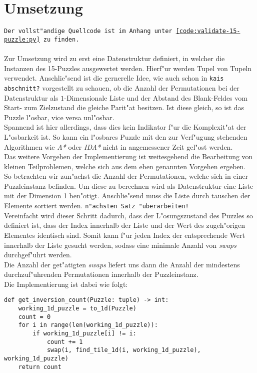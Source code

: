 \section{Umsetzung} %
\label{cha:Umsetzung}
\texttt{Der vollst"andige Quellcode ist im Anhang unter \ref{code:validate-15-puzzle:py} zu finden.}\\\\
Zur Umsetzung wird zu erst eine Datenstruktur definiert, in welcher die Instanzen des 15-Puzzles ausgewertet werden. Hierf"ur werden Tupel von Tupeln verwendet.
Anschlie"send ist die gernerelle Idee, wie auch schon in \texttt{kais abschnitt?} vorgestellt zu schauen, ob die Anzahl der Permutationen bei der Datenstruktur als $1$-Dimensionale Liste und der Abstand des Blank-Feldes vom Start- zum Zielzustand die gleiche Parit"at besitzen.
Ist diese gleich, so ist das Puzzle l"osbar, vice versa unl"osbar.\\
Spannend ist hier allerdings, dass dies kein Indikator f"ur die Komplexit"at der L"osbarkeit ist. So kann ein l"osbares Puzzle mit den zur Verf"ugung stehenden Algorithmen wie \textit{A*} oder \textit{IDA*} nicht in angemessener Zeit gel"ost werden.\\
Das weitere Vorgehen der Implementierung ist weitesgehend die Bearbeitung von kleinen Teilproblemen, welche sich aus dem eben genannten Vorgehen ergeben.\\
So betrachten wir zun"achst die Anzahl der Permutationen, welche sich in einer Puzzleinstanz befinden. Um diese zu berechnen wird als Datenstruktur eine Liste mit der Dimension 1 ben"otigt.
Anschlie"send muss die Liste durch tauschen der Elemente sortiert werden.
\texttt{n"achsten Satz "uberarbeiten!}\\
Vereinfacht wird dieser Schritt dadurch, dass der L"osungszustand des Puzzles so definiert ist, dass der Index innerhalb der Liste und der Wert des zugeh"origen Elementes identisch sind. Somit kann f"ur jeden Index der entsprechende Wert innerhalb der Liste gesucht werden, sodass eine minimale Anzahl von \textit{swaps} durchgef"uhrt werden. \\Die Anzahl der get"atigten \textit{swaps} liefert uns dann die Anzahl der mindestens durchzuf"uhrenden Permutationen innerhalb der Puzzleinstanz.\\
Die Implementierung ist dabei wie folgt:
\begin{verbatim}
def get_inversion_count(Puzzle: tuple) -> int:
    working_1d_puzzle = to_1d(Puzzle)
    count = 0
    for i in range(len(working_1d_puzzle)):
        if working_1d_puzzle[i] != i:
            count += 1
            swap(i, find_tile_1d(i, working_1d_puzzle), working_1d_puzzle)
    return count
\end{verbatim}
